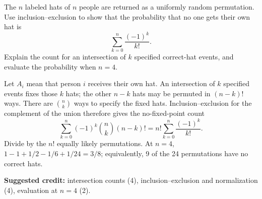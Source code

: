 \documentclass[11pt,letterpaper]{article}
\begin{document}
The $n$ labeled hats of $n$ people are returned as a uniformly random
permutation. Use inclusion--exclusion to show that the probability that
no one gets their own hat is
\[
 \sum_{k=0}^n\frac{(-1)^k}{k!}.
\]
Explain the count for an intersection of $k$ specified correct-hat events,
and evaluate the probability when $n=4$.
\begin{solution}
Let $A_i$ mean that person $i$ receives their own hat. An intersection
of $k$ specified events fixes those $k$ hats; the other $n-k$ hats may
be permuted in $(n-k)!$ ways. There are $\binom nk$ ways to specify
the fixed hats. Inclusion--exclusion for the complement of the union
therefore gives the no-fixed-point count
\[
 \sum_{k=0}^n(-1)^k\binom nk(n-k)!
 =n!\sum_{k=0}^n\frac{(-1)^k}{k!}.
\]
Divide by the $n!$ equally likely permutations. At $n=4$,
$1-1+1/2-1/6+1/24=3/8$; equivalently, 9 of the 24 permutations
have no correct hats.

\textbf{Suggested credit:} intersection counts (4), inclusion--exclusion
and normalization (4), evaluation at $n=4$ (2).
\end{solution}
\end{document}
